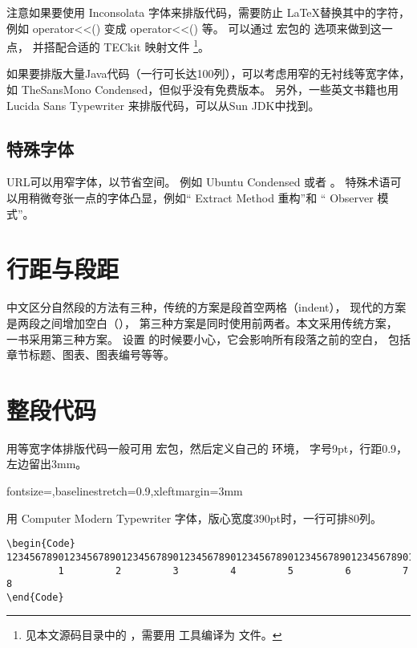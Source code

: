 注意如果要使用 Inconsolata 字体来排版代码，需要防止 \LaTeX 替换其中的字符，
例如 { operator<<()} 变成 { operator<<()} 等。
可以通过  宏包的  选项来做到这一点，
并搭配合适的 TECkit 映射文件
\footnote{见本文源码目录中的 ，需要用  工具编译为  文件。}。

如果要排版大量Java代码（一行可长达100列），可以考虑用窄的无衬线等宽字体，
如 TheSansMono Condensed，但似乎没有免费版本。
另外，一些英文书籍也用 {\small {}Lucida Sans Typewriter} 来排版代码，可以从Sun JDK中找到。

\subsection{特殊字体}
URL可以用窄字体，以节省空间。
例如 {Ubuntu Condensed} 或者 。
特殊术语可以用稍微夸张一点的字体凸显，例如“{ Extract Method} 重构”和
“{ Observer} 模式”。

\section{行距与段距}
中文区分自然段的方法有三种，传统的方案是段首空两格（indent），
现代的方案是两段之间增加空白（），
第三种方案是同时使用前两者。本文采用传统方案，
\mybooktitle 一书采用第三种方案。
设置 的时候要小心，它会影响所有段落之前的空白，
包括章节标题、图表、图表编号等等。

\section{整段代码}
用等宽字体排版代码一般可用  宏包，然后定义自己的 环境，
字号9pt，行距0.9，左边留出3mm。
\begin{Code}
%
  {fontsize=\small,baselinestretch=0.9,xleftmargin=3mm}
\end{Code}

用 { Computer Modern Typewriter} 字体，版心宽度390pt时，一行可排80列。
\begin{Verbatim}[fontsize=\small,baselinestretch=0.9,xleftmargin=3mm]
\begin{Code}
12345678901234567890123456789012345678901234567890123456789012345678901234567890
         1         2         3         4         5         6         7         8
\end{Code}
\end{Verbatim}

